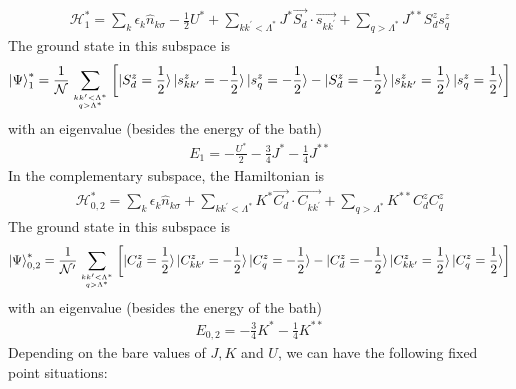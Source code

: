 \documentclass[twoside]{report}
\numberwithin{equation}{section}
\begin{document}
\begin{equation}\begin{aligned}
	\mathcal{H}^*_{1} = \sum_k \epsilon_k \hat n_{k\sigma} - \frac{1}{2} U^* + \sum_{kk^\prime < \Lambda^*}J^* \vec{S_d}\cdot\vec{s_{kk^\prime}}+ \sum_{q > \Lambda^*}J^{**} S_d^z s^z_{q}
\end{aligned}\end{equation}
The ground state in this subspace is
\begin{equation}\begin{aligned}
	\ket{\Psi}^*_{1}= \frac{1}{\mathcal{N}}\sum_{kk^\prime < \Lambda^*\atop{q>\Lambda^*}}\left[\ket{S_d^z= \frac{1}{2}}\ket{s^z_{kk^\prime}= - \frac{1}{2}}\ket{s^z_{q}= - \frac{1}{2}} - \ket{S_d^z=- \frac{1}{2}}\ket{s^z_{kk^\prime}=  \frac{1}{2}}\ket{s^z_{q}=  \frac{1}{2}}\right]
\end{aligned}\end{equation}
with an eigenvalue (besides the energy of the bath)
\begin{equation}\begin{aligned}
	E_{1} = - \frac{U^*}{2} - \frac{3}{4}J^* - \frac{1}{4}J^{**}
\end{aligned}\end{equation}
In the complementary subspace, the Hamiltonian is
\begin{equation}\begin{aligned}
	\mathcal{H}^*_{0,2} = \sum_k \epsilon_k \hat n_{k\sigma} + \sum_{kk^\prime < \Lambda^*}K^* \vec{C_d}\cdot\vec{C_{kk^\prime}}+ \sum_{q > \Lambda^*}K^{**} C_d^z C^z_{q}
\end{aligned}\end{equation}
The ground state in this subspace is
\begin{equation}\begin{aligned}
	\ket{\Psi}^*_{0,2}= \frac{1}{\mathcal{N^\prime}}\sum_{kk^\prime < \Lambda^*\atop{q>\Lambda^*}}\left[\ket{C_d^z= \frac{1}{2}}\ket{C^z_{kk^\prime}= - \frac{1}{2}}\ket{C^z_{q}= - \frac{1}{2}} - \ket{C_d^z=- \frac{1}{2}}\ket{C^z_{kk^\prime}=  \frac{1}{2}}\ket{C^z_{q}=  \frac{1}{2}}\right]
\end{aligned}\end{equation}
with an eigenvalue (besides the energy of the bath)
\begin{equation}\begin{aligned}
	E_{0,2} = - \frac{3}{4}K^* - \frac{1}{4}K^{**}
\end{aligned}\end{equation}
Depending on the bare values of \(J,K\) and \(U\), we can have the following fixed point situations:
\end{document}
